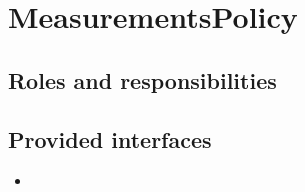 \section{MeasurementsPolicy}
\label{element:measurements-policy}

\subsection{Roles and responsibilities}

\subsection{Provided interfaces}

\begin{itemize}
  \item 
\end{itemize}